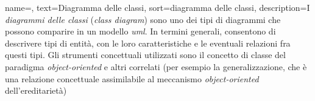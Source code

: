 {
    name=,
    text=Diagramma delle classi,
    sort=diagramma delle classi,
    description={I \textit{diagrammi delle classi} (\textit{class diagram}) sono uno dei tipi di diagrammi che possono comparire in un modello \textit{\gls{uml}}. In termini generali, consentono di descrivere tipi di entità, con le loro caratteristiche e le eventuali relazioni fra questi tipi. Gli strumenti concettuali utilizzati sono il concetto di classe del paradigma \textit{object-oriented} e altri correlati (per esempio la generalizzazione, che è una relazione concettuale assimilabile al meccanismo \textit{object-oriented} dell'ereditarietà)}
}
 




